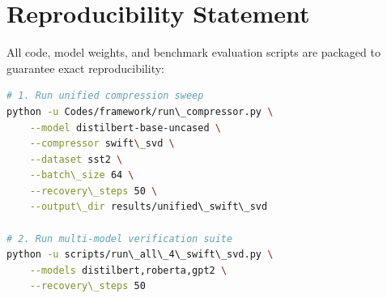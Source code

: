 \section{Reproducibility Statement}
All code, model weights, and benchmark evaluation scripts are packaged to guarantee exact reproducibility:
\begin{lstlisting}[language=bash]
# 1. Run unified compression sweep
python -u Codes/framework/run\_compressor.py \
    --model distilbert-base-uncased \
    --compressor swift\_svd \
    --dataset sst2 \
    --batch\_size 64 \
    --recovery\_steps 50 \
    --output\_dir results/unified\_swift\_svd

# 2. Run multi-model verification suite
python -u scripts/run\_all\_4\_swift\_svd.py \
    --models distilbert,roberta,gpt2 \
    --recovery\_steps 50
\end{lstlisting}
